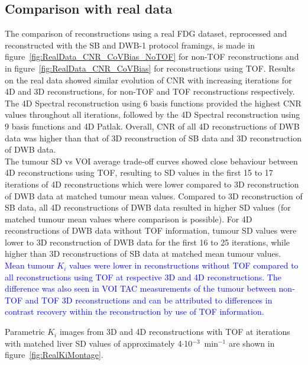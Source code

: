 \subsection*{Comparison with real data}
The comparison of reconstructions using a real FDG dataset, reprocessed and reconstructed with the SB and DWB-1 protocol framings, is made in figure~\ref{fig:RealData_CNR_CoVBias_NoTOF} for non-TOF reconstructions and in figure~\ref{fig:RealData_CNR_CoVBias} for reconstructions using TOF. %
Results on the real data showed similar evolution of CNR with increasing iterations for 4D and 3D reconstructions, for non-TOF and TOF reconstructions respectively.
The 4D Spectral reconstruction using 6 basis functions provided the highest CNR values throughout all iterations, followed by the 4D Spectral reconstruction using 9 basis functions and 4D Patlak. Overall, CNR of all 4D reconstructions of DWB data was higher than that of 3D reconstruction of SB data and 3D reconstruction of DWB data.\\
The tumour SD vs VOI average trade-off curves showed close behaviour between 4D reconstructions using TOF, resulting to SD values in the first 15 to 17 iterations of 4D reconstructions which were lower compared to 3D reconstruction of DWB data at matched tumour mean values. Compared to 3D reconstruction of SB data, all 4D reconstructions of DWB data resulted in higher SD values (for matched tumour mean values where comparison is possible).
For 4D reconstructions of DWB data without TOF information, tumour SD values were lower to 3D reconstruction of DWB data for the first 16 to 25 iterations, while higher than 3D reconstructions of SB data at matched mean tumour values. 
\textcolor{blue}{Mean tumour $K_i$ values were lower in reconstructions without TOF compared to all reconstructions using TOF at respective 3D and 4D reconstructions. The difference was also seen in VOI TAC measurements of the tumour between non-TOF and TOF 3D reconstructions and can be attributed to differences in contrast recovery within the reconstruction by use of TOF information.}

Parametric $K_i$ images from 3D and 4D reconstructions with TOF at iterations with matched liver SD values of approximately 4$\cdot$10$^{-3}$~min$^{-1}$ are shown in figure~\ref{fig:RealKiMontage}.

